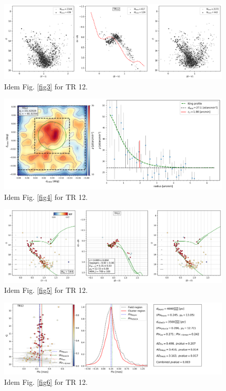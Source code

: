 \documentclass[draft]{aa}
\begin{document}
\begin{figure}[ht]
    \centering
    \includegraphics[width=\hsize]{../figs/obs_TR12.png}
    \caption{Idem Fig. \ref{fig3} for TR 12.}
    \label{fig19}
\end{figure}
\begin{figure}[ht]
    \centering
    \includegraphics[width=\hsize]{../figs/dmap_trumpler12.png}
    \caption{Idem Fig. \ref{fig4} for TR 12.}
    \label{fig20}
\end{figure}
\begin{figure}[ht]
    \centering
    \includegraphics[width=\hsize]{../figs/cmds_tr12.png}
    \caption{Idem Fig. \ref{fig5} for TR 12.}
    \label{fig21}
\end{figure}
\begin{figure}[ht]
    \centering
    \includegraphics[width=\hsize]{../figs/plx_TR12.png}
    \caption{Idem Fig. \ref{fig6} for TR 12.}
    \label{fig22}
\end{figure}
\end{document}

